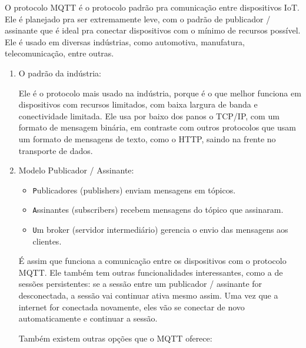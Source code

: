\documentclass[a4paper]{article}
\begin{document}
    \begin{answer}
        O protocolo MQTT é o protocolo padrão pra comunicação entre dispositivos IoT. Ele é
        planejado pra ser extremamente leve, com o padrão de publicador / assinante que é ideal pra
        conectar dispositivos com o mínimo de recursos possível. Ele é usado em diversas indústrias,
        como automotiva, manufatura, telecomunicação, entre outras.

        \begin{enumerate}
            \item O padrão da indústria:
            
                Ele é o protocolo mais usado na indústria, porque é o que melhor funciona em dispositivos com
                recursos limitados, com baixa largura de banda e conectividade limitada. Ele usa por baixo dos
                panos o TCP/IP, com um formato de mensagem binária, em contraste com outros protocolos
                que usam um formato de mensagens de texto, como o HTTP, saindo na frente no transporte de
                dados.
            
            \item Modelo Publicador / Assinante:
            \begin{itemize}
                    \item \texttt Publicadores (publishers) enviam mensagens em tópicos.
                    \item \texttt Assinantes (subscribers) recebem mensagens do tópico que assinaram.
                    \item \texttt Um broker (servidor intermediário) gerencia o envio das mensagens aos clientes.
                \end{itemize}
            
            É assim que funciona a comunicação entre os dispositivos com o protocolo MQTT. Ele também
            tem outras funcionalidades interessantes, como a de sessões persistentes: se a sessão entre
            um publicador / assinante for desconectada, a sessão vai continuar ativa mesmo assim. Uma
            vez que a internet for conectada novamente, eles vão se conectar de novo automaticamente e
            continuar a sessão.

            Também existem outras opções que o MQTT oferece:


\end{enumerate}
\end{answer}
\end{document}
